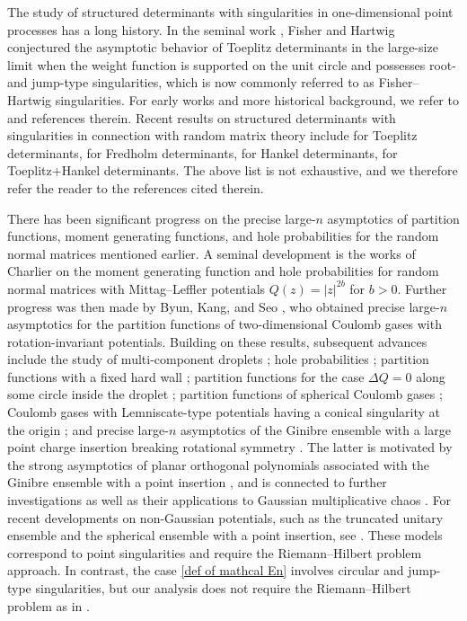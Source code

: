 \documentclass[reqno]{amsart}
\newcommand{\1}{\mathds{1}}
\numberwithin{equation}{section}
\theoremstyle{definition}
\begin{document}
The study of structured determinants with singularities in one-dimensional point processes has a long history. In the seminal work \cite{FisherHartwig}, Fisher and Hartwig conjectured the asymptotic behavior of Toeplitz determinants in the large-size limit when the weight function is supported on the unit circle and possesses root- and jump-type singularities, which is now commonly referred to as Fisher--Hartwig singularities. 
For early works and more historical background, we refer to \cite{DIKreview} and references therein. 
Recent results on structured determinants with singularities in connection with random matrix theory include \cite{DIK, DIK14, Fahs,CGMY2020,CK2015,BCL2024} for Toeplitz determinants, \cite{DXZ2022,DXZ2023,LYZ24,Xetal,XZZ2024,YZ24,CM2023} for Fredholm determinants, \cite{Krasovsky, ItsKrasovsky, BerWebbWong, Charlier, CFWW2021} for Hankel determinants, \cite{BasorEhrhardt1, DIK} for Toeplitz+Hankel determinants. The above list is not exhaustive, and we therefore refer the reader to the references cited therein.


There has been significant progress on the precise large-$n$ asymptotics of partition functions, moment generating functions, and hole probabilities for the random normal matrices mentioned earlier. 
A seminal development is the works of Charlier \cite{C2021 FH,C2021} on the moment generating function and hole probabilities for random normal matrices with Mittag–Leffler potentials $Q(z)=|z|^{2b}$ for $b>0$.
Further progress was then made by Byun, Kang, and Seo \cite{BKS2023}, who obtained precise large-$n$ asymptotics for the partition functions of two-dimensional Coulomb gases with rotation-invariant potentials. 
Building on these results, subsequent advances include the study of multi-component droplets \cite{ACC2023c}; hole probabilities \cite{C2023,BP24}; partition functions with a fixed hard wall \cite{AFLS25}; partition functions for the case $\Delta Q=0$ along some circle inside the droplet \cite{AL25}; partition functions of spherical Coulomb gases \cite{BKSY2025}; Coulomb gases with Lemniscate-type potentials having a conical singularity at the origin \cite{Byun25}; and precise large-$n$ asymptotics of the Ginibre ensemble with a large point charge insertion breaking rotational symmetry \cite{BSY2025}. The latter is motivated by the strong asymptotics of planar orthogonal polynomials associated with the Ginibre ensemble with a point insertion \cite{BBLM2015}, and is connected to further investigations \cite{BEG18,BKP2023,Byun,LeeYang,LeeYang2,LY2023,BLY2022,BY2023} as well as their applications to Gaussian multiplicative chaos \cite{WebbWong}.
For recent developments on non-Gaussian potentials, such as the truncated unitary ensemble and the spherical ensemble with a point insertion, see \cite{DKMS25,BFL25,BFKL25}. These models correspond to point singularities and require the Riemann–Hilbert problem approach. In contrast, the case \eqref{def of mathcal En} involves circular and jump-type singularities, but our analysis does not require the Riemann–Hilbert problem as in \cite{BC2022}.
\end{document}
